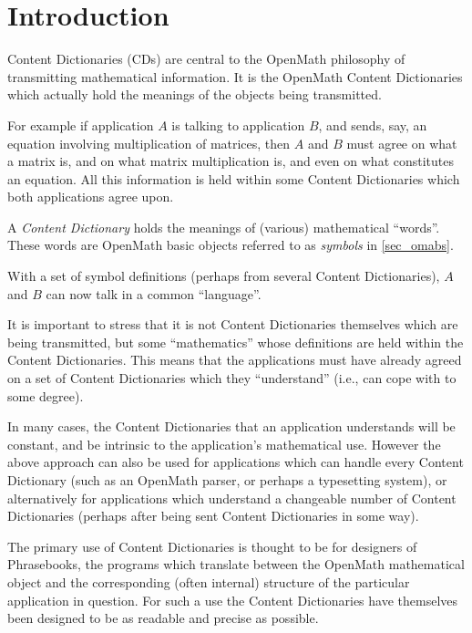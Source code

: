 \documentclass{report}
\def\textquote#1{``#1''}
\def\OM{OpenMath\xspace}
\begin{document}
\section{Introduction}\label{sec_cd_summary}
    
Content Dictionaries (CDs) are central to the \OM philosophy of transmitting mathematical
information. It is the \OM Content Dictionaries which actually hold the meanings of the
objects being transmitted.

    
For example if application $A$ is talking to application $B$, and sends, say, an equation
involving multiplication of matrices, then $A$ and $B$ must agree on what a matrix is, and
on what matrix multiplication is, and even on what constitutes an equation. All this
information is held within some Content Dictionaries which both applications agree upon.

    
A \emph{ Content Dictionary} holds the meanings of (various) mathematical
\textquote{words}. These words are \OM basic objects referred to as \emph{symbols} in
\ref{sec_omabs}.

    
With a set of symbol definitions (perhaps from several Content Dictionaries), $A$ and $B$
can now talk in a common \textquote{language}.

    
It is important to stress that it is not Content Dictionaries themselves which are being
transmitted, but some \textquote{mathematics} whose definitions are held within the
Content Dictionaries. This means that the applications must have already agreed on a set
of Content Dictionaries which they \textquote{understand} (i.e., can cope with to some
degree).

    
In many cases, the Content Dictionaries that an application understands will be constant,
and be intrinsic to the application's mathematical use. However the above approach can
also be used for applications which can handle every Content Dictionary (such as an \OM
parser, or perhaps a typesetting system), or alternatively for applications which
understand a changeable number of Content Dictionaries (perhaps after being sent Content
Dictionaries in some way).

    
The primary use of Content Dictionaries is thought to be for designers of Phrasebooks, the
programs which translate between the \OM mathematical object and the corresponding (often
internal) structure of the particular application in question. For such a use the Content
Dictionaries have themselves been designed to be as readable and precise as possible.
\end{document}
